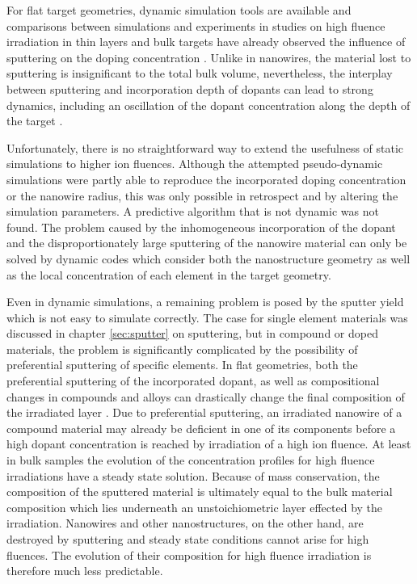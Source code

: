 For flat target geometries, dynamic simulation tools are available \cite{moller_tridyn_1984,moller_tridyn-binary_1988} and comparisons between simulations and experiments in studies on high fluence irradiation in thin layers and bulk targets have already observed the influence of sputtering on the doping concentration \cite{miyagawa_computer_1991,sigmund_alloy_1993}. Unlike in nanowires, the material lost to sputtering is insignificant to the total bulk volume, nevertheless, the interplay between sputtering and incorporation depth of dopants can lead to strong dynamics, including an oscillation of the dopant concentration along the depth of the target \cite{eckstein_oscillations_2000}. 

Unfortunately, there is no straightforward way to extend the usefulness of static simulations to higher ion fluences. Although the attempted pseudo-dynamic simulations were partly able to reproduce the incorporated doping concentration or the nanowire radius, this was only possible in retrospect and by altering the simulation parameters. A predictive algorithm that is not dynamic was not found. The problem caused by the inhomogeneous incorporation of the dopant and the disproportionately large sputtering of the nanowire material can only be solved by dynamic codes which consider both the nanostructure geometry as well as the local concentration of each element in the target geometry.

Even in dynamic simulations, a remaining problem is posed by the sputter yield which is not easy to simulate correctly. The case for single element materials was discussed in chapter \ref{sec:sputter} on sputtering, but in compound or doped materials, the problem is significantly complicated by the possibility of preferential sputtering of specific elements. In flat geometries, both the preferential sputtering of the incorporated dopant, as well as compositional changes in compounds and alloys can drastically change the final composition of the irradiated layer \cite{moller_tridyn_1984,andersen_computer_1986,moller_tridyn-binary_1988,sigmund_alloy_1993,zaporozchenko_preferential_1995}. Due to preferential sputtering, an irradiated nanowire of a compound material may already be deficient in one of its components before a high dopant concentration is reached by irradiation of a high ion fluence. At least in bulk samples the evolution of the concentration profiles for high fluence irradiations have a steady state solution. Because of mass conservation, the composition of the sputtered material is ultimately equal to the bulk material composition which lies underneath an unstoichiometric layer effected by the irradiation. Nanowires and other nanostructures, on the other hand, are destroyed by sputtering and steady state conditions cannot arise for high fluences. The evolution of their composition for high fluence irradiation is therefore much less predictable.
